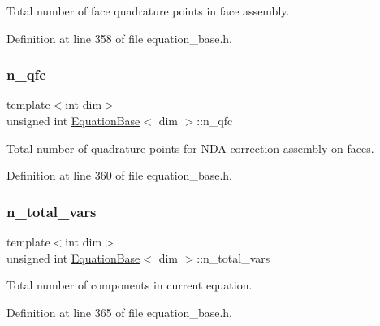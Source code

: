 Total number of face quadrature points in face assembly. 



Definition at line 358 of file equation\+\_\+base.\+h.

\mbox{\label{class_equation_base_a5cb013018da03250a101941f196df23b}} 
\subsubsection{\texorpdfstring{n\+\_\+qfc}{n\_qfc}}
{\footnotesize\ttfamily template$<$int dim$>$ \\
unsigned int \hyperlink{class_equation_base}{Equation\+Base}$<$ dim $>$\+::n\+\_\+qfc\hspace{0.3cm}{\ttfamily [protected]}}



Total number of quadrature points for N\+DA correction assembly on faces. 



Definition at line 360 of file equation\+\_\+base.\+h.

\mbox{\label{class_equation_base_a505c44d58215a614d263615a53159fda}} 
\subsubsection{\texorpdfstring{n\+\_\+total\+\_\+vars}{n\_total\_vars}}
{\footnotesize\ttfamily template$<$int dim$>$ \\
unsigned int \hyperlink{class_equation_base}{Equation\+Base}$<$ dim $>$\+::n\+\_\+total\+\_\+vars\hspace{0.3cm}{\ttfamily [protected]}}



Total number of components in current equation. 



Definition at line 365 of file equation\+\_\+base.\+h.

\mbox{\label{class_equation_base_aafed438df52a6a2adca972fad322dd7b}} 
